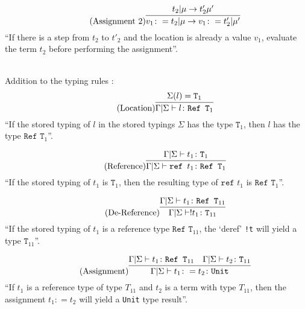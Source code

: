 \begin{equation*}
    \tag{Assignment 2}
    \infer{
        v_1 \colon = t_2 | \mu \rightarrow v_1 \colon = t'_2 | \mu'
    }{
        t_2 | \mu \rightarrow t'_2 \mu'
    }
\end{equation*}
``If there is a step from $t_2$ to $t'_2$ and the location
is already a value $v_1$, evaluate the term $t_2$ before
performing the assignment''.

~\\
Addition to the typing rules \cite{pierce2002ProgLang}:
\begin{equation*}
    \tag{Location}
    \infer{
        \Gamma | \Sigma \vdash l \colon \texttt{Ref T}_1
    }{
        \Sigma(l) = \texttt{T}_1
    }
\end{equation*}
``If the stored typing of $l$ in the stored typings $\Sigma$ has
the type $\texttt{T}_1$, then $l$ has the type $\texttt{Ref T}_1$''.

\begin{equation*}
    \tag{Reference}
    \infer{
        \Gamma | \Sigma \vdash \texttt{ref } t_1 \colon \texttt{Ref T}_1
    }{
        \Gamma | \Sigma \vdash t_1 \colon \texttt{T}_1
    }
\end{equation*}
``If the stored typing of $t_1$ is $\texttt{T}_1$, then the resulting type
of $\texttt{ref } t_1$ is $\texttt{Ref T}_1$''.

\begin{equation*}
    \tag{De-Reference}
    \infer{
        \Gamma | \Sigma \vdash !t_1 \colon \texttt{T}_{11}
    }{
        \Gamma | \Sigma \vdash t_1 \colon \texttt{Ref T}_{11}
    }
\end{equation*}
``If the stored typing of $t_1$ is a reference type $\texttt{Ref T}_{11}$,
the `deref' \texttt{!t} will yield a type $\texttt{T}_{11}$''.

\begin{equation*}
    \tag{Assignment}
    \infer{
        \Gamma | \Sigma \vdash t_1 \colon = t_2 \colon \texttt{Unit}
    }{
        \Gamma | \Sigma \vdash t_1 \colon \texttt{Ref T}_{11}
        &
        \Gamma | \Sigma \vdash t_2 \colon \texttt{T}_{11}
    }
\end{equation*}
``If $t_1$ is a reference type of type $T_{11}$ and $t_2$ is a term
with type $T_{11}$, then the assignment $t_1 \colon = t_2$ will
yield a \texttt{Unit} type result''.
